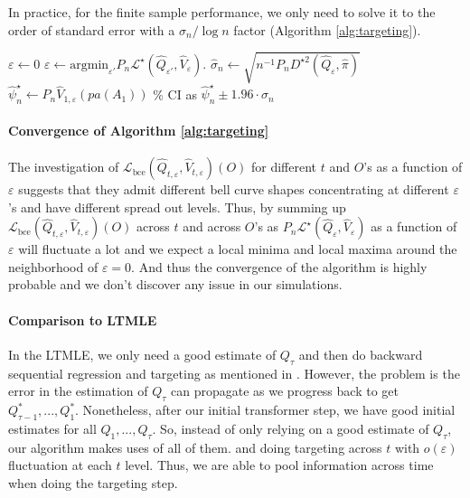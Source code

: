 \documentclass{article}
\theoremstyle{plain}
\theoremstyle{definition}
\theoremstyle{remark}
\begin{document}
In practice, for the finite sample performance, we only need to solve it to the order of standard error with a $\sigma_n/\log n$ factor \cite{laanTLBook2011} (Algorithm \ref{alg:targeting}).

\begin{algorithm}
    \caption{Temporal-Difference Targeting}
    \label{alg:targeting}
\begin{algorithmic}[1]
   
   \STATE $\varepsilon\leftarrow 0$
   \REPEAT
   \STATE$\varepsilon\leftarrow\mathrm{argmin}_{\varepsilon'} P_n\mathcal{L}^\star(\hat{Q}_{\varepsilon'}, \hat{V}_{\varepsilon}).$
   \STATE $\hat{\sigma}_n\leftarrow \sqrt{n^{-1}P_nD^{\star2}(\hat{Q}_{\varepsilon}, \hat{\pi})}$
   \STATE $\hat{\psi}^\star_{n}\leftarrow P_n\hat{V}_{1,\varepsilon}(pa(A_1))$
   \% CI as $\hat{\psi}^\star_{n}\pm 1.96 \cdot \hat{\sigma}_n$
\end{algorithmic}
\end{algorithm}

\paragraph{Convergence of Algorithm \ref{alg:targeting}}
The investigation of $\mathcal{L}_{\mathrm{bce}}(\hat{Q}_{t,\varepsilon}, \hat{V}_{t,\varepsilon})(O)$ for different $t$ and $O$'s as a function of $\varepsilon$ suggests that they admit different bell curve shapes concentrating at different $\varepsilon$'s and have different spread out levels. Thus, by summing up $\mathcal{L}_{\mathrm{bce}}(\hat{Q}_{t,\varepsilon}, \hat{V}_{t,\varepsilon})(O)$ across $t$ and across $O$'s as $P_n\mathcal{L}^\star(\hat{Q}_{\varepsilon}, \hat{V}_{\varepsilon})$ as a function of $\varepsilon$ will fluctuate a lot and we expect a local minima and local maxima around the neighborhood of $\varepsilon=0$. And thus the convergence of the algorithm is highly probable and we don't discover any issue in our simulations.

\paragraph{Comparison to LTMLE}
In the LTMLE, we only need a good estimate of ${Q}_\tau$ and then do backward sequential regression and targeting as mentioned in \cite{laanTargetedMinimumLoss2012}. However, the problem is the error in the estimation of ${Q}_\tau$ can propagate as we progress back to get ${Q}^{*}_{\tau-1},...,{Q}^{*}_{1}$. Nonetheless, after our initial transformer step, we have good initial estimates for all ${Q}_{1},...,{Q}_{\tau}$. So, instead of only relying on a good estimate of ${Q}_\tau$, our algorithm makes uses of all of them. and doing targeting across $t$ with $o(\varepsilon)$ fluctuation at each $t$ level. Thus, we are able to pool information across time when doing the targeting step.
\end{document}
